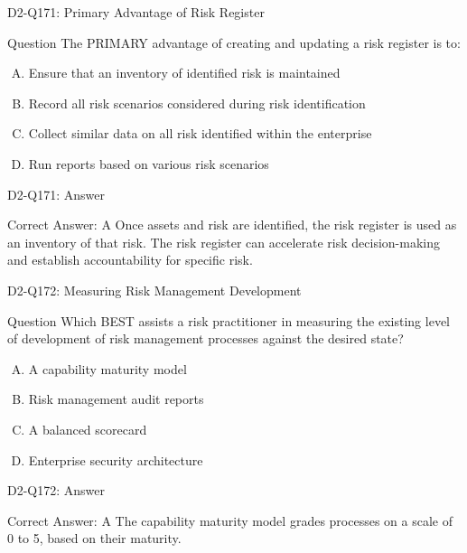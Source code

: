 \documentclass{beamer}
\begin{document}
	\begin{frame}{D2-Q171: Primary Advantage of Risk Register}
		\begin{block}{Question}
			The PRIMARY advantage of creating and updating a risk register is to:
		\end{block}
		\begin{enumerate}[(A)]
			\item Ensure that an inventory of identified risk is maintained
			\item Record all risk scenarios considered during risk identification
			\item Collect similar data on all risk identified within the enterprise
			\item Run reports based on various risk scenarios
		\end{enumerate}
	\end{frame}
	\begin{frame}{D2-Q171: Answer}
		\begin{block}{Correct Answer: A}
			Once assets and risk are identified, the risk register is used as an inventory of that risk. The risk register can accelerate risk decision-making and establish accountability for specific risk.
		\end{block}
	\end{frame}
	
	\begin{frame}{D2-Q172: Measuring Risk Management Development}
		\begin{block}{Question}
			Which BEST assists a risk practitioner in measuring the existing level of development of risk management processes against the desired state?
		\end{block}
		\begin{enumerate}[(A)]
			\item A capability maturity model
			\item Risk management audit reports
			\item A balanced scorecard
			\item Enterprise security architecture
		\end{enumerate}
	\end{frame}
	\begin{frame}{D2-Q172: Answer}
		\begin{block}{Correct Answer: A}
			The capability maturity model grades processes on a scale of 0 to 5, based on their maturity.
		\end{block}
	\end{frame}
	
\end{document}

